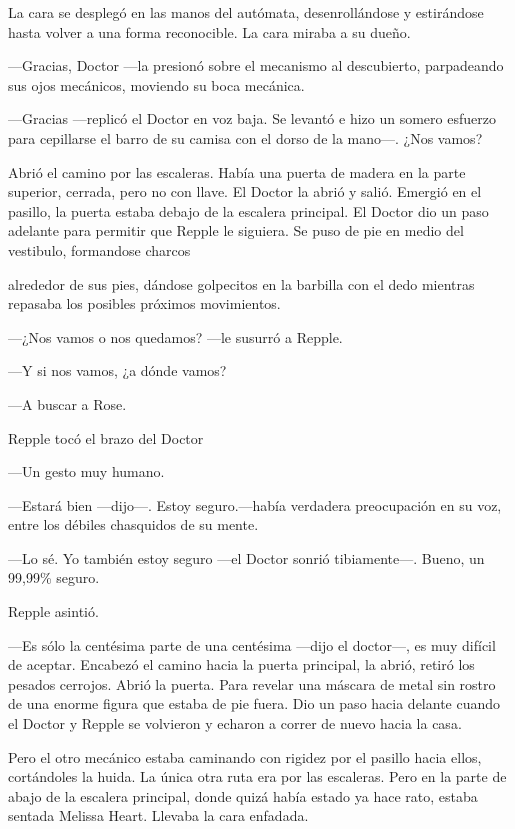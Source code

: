 {La cara se desplegó en las manos del autómata, desenrollándose y
	estirándose hasta volver a una forma reconocible. La cara miraba a su
dueño.}

{---Gracias, Doctor ---la presionó sobre el mecanismo al descubierto,
parpadeando sus ojos mecánicos, moviendo su boca mecánica.}

{---Gracias ---replicó el Doctor en voz baja. Se levantó e hizo un
	somero esfuerzo para cepillarse el barro de su camisa con el dorso de la
mano---. ¿Nos vamos?}

{Abrió el camino por las escaleras. Había una puerta de madera en la
	parte superior, cerrada, pero no con llave. El Doctor la abrió y salió.
	Emergió en el pasillo, la puerta estaba debajo de la escalera principal.
	El Doctor dio un paso adelante para permitir que Repple le siguiera. Se
puso de pie en medio del vestibulo, formandose charcos}

{alrededor de sus pies, dándose golpecitos en la barbilla con el dedo
mientras repasaba los posibles próximos movimientos.}

{---¿Nos vamos o nos quedamos? ---le susurró a Repple.}

{---Y si nos vamos, ¿a dónde vamos?}

{---A buscar a Rose.}

{Repple tocó el brazo del Doctor}

{---Un gesto muy humano.}

{---Estará bien ---dijo---. Estoy seguro.---había verdadera preocupación
en su voz, entre los débiles chasquidos de su mente.}

{---Lo sé. Yo también estoy seguro ---el Doctor sonrió tibiamente---.
	Bueno, un 99,99\% seguro.}

{Repple asintió.}

{---Es sólo la centésima parte de una centésima ---dijo el doctor---, es
	muy difícil de aceptar. Encabezó el camino hacia la puerta principal, la
	abrió, retiró los pesados cerrojos. Abrió la puerta. Para revelar una
	máscara de metal sin rostro de una enorme figura que estaba de pie
	fuera. Dio un paso hacia delante cuando el Doctor y Repple se volvieron
y echaron a correr de nuevo hacia la casa.}

{Pero el otro mecánico estaba caminando con rigidez por el pasillo hacia
	ellos, cortándoles la huida. La única otra ruta era por las escaleras.
	Pero en la parte de abajo de la escalera principal, donde quizá había
	estado ya hace rato, estaba sentada Melissa Heart. Llevaba la cara
enfadada.}

